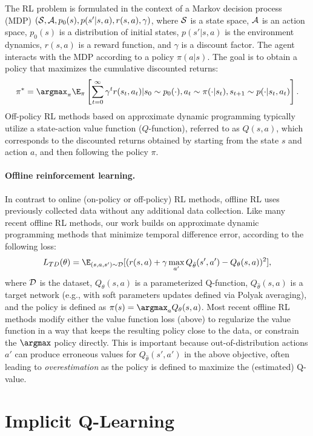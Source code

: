 \documentclass{article} %
\begin{document}
The RL problem is formulated in the context of a Markov decision process (MDP) $(\mathcal{S}, \mathcal{A}, p_0(s), p(s'|s,a), r(s,a), \gamma)$, where $\mathcal{S}$ is a state space, $\mathcal{A}$ is an action space, $p_0(s)$ is a distribution of initial states, $p(s' | s, a)$ is the environment dynamics, $r(s,a)$ is a reward function, and $\gamma$ is a discount factor. The agent interacts with the MDP according to a policy $\pi(a|s)$. The goal is to obtain a policy that maximizes the cumulative discounted returns: 
$$\pi^* = \argmax_\pi \E_\pi\left[\sum_{t=0}^\infty\gamma^t r(s_t, a_t) | \allowbreak s_0 \sim p_0(\cdot), \allowbreak  a_t \sim \pi(\cdot|s_t), \allowbreak s_{t+1} \sim p(\cdot|s_t, a_t) \right].$$
Off-policy RL methods based on approximate dynamic programming typically utilize a state-action value function ($Q$-function), referred to as $Q(s, a)$, which corresponds to the discounted returns obtained by starting from the state $s$ and action $a$, and then following the policy $\pi$.

\paragraph{Offline reinforcement learning.} In contrast to online (on-policy or off-policy) RL methods, offline RL uses previously collected data without any additional data collection. Like many recent offline RL methods, our work builds on approximate dynamic programming methods that minimize temporal difference error, according to the following loss:
\begin{equation}
L_{TD}(\theta) = \E_{(s, a, s')\sim\D}[(r(s,a) + \gamma \max_{a'}Q_{\hat{\theta}}(s',a') - Q_\theta(s,a))^2],
\label{eqn:td}
\end{equation}
where $\mathcal{D}$ is the dataset,
$Q_\theta(s,a)$ is a parameterized Q-function, $Q_{\hat{\theta}}(s,a)$ is a target network (e.g., with soft parameters updates defined via Polyak averaging), and the policy is defined as $\pi(s) = \argmax_a Q_\theta(s,a)$. Most recent offline RL methods modify either the value function loss (above) to regularize the value function in a way that keeps the resulting policy close to the data, or constrain the $\argmax$ policy directly. This is important because out-of-distribution actions $a'$ can produce erroneous values for $Q_{\hat{\theta}}(s',a')$ in the above objective, often leading to \emph{overestimation} as the policy is defined to maximize the (estimated) Q-value.


\section{Implicit Q-Learning}
\end{document}
